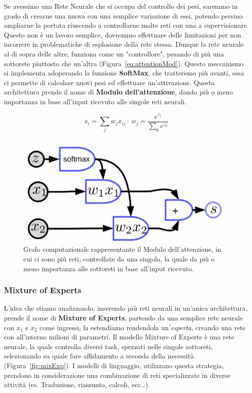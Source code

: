 Se avessimo una Rete Neurale che si occupa del controllo dei pesi, saremmo in grado di crearne una nuova con una semplice variazione di essi, potendo persino ampliarne la portata riuscendo a controllarne molte reti con una a supervisionare. Questo non è un lavoro semplice, dovremmo effettuare delle limitazioni per non incorrere in problematiche di esplosione della rete stessa. Dunque la rete neurale al di sopra delle altre, funziona come un "controllore", pesando di più una sottorete piuttosto che un'altra (Figura~\ref{eq:attentionMod}). Questo meccanismo si implementa adoperando la funzione \textbf{SoftMax}, che tratteremo più avanti, essa ci permette di calcolare nuovi pesi ed effettuare un'attivazione. Questa architettura prende il nome di \textbf{Modulo dell'attenzione}, dando più o meno importanza in base all'input ricevuto alle singole reti neurali.

\begin{equation}
    s_i = \sum_jw_jx_{ij} \,:\,w_j=\frac{e^{z_{j}}}{\sum_ke^{z_k}}
    \label{eq:attentionMod}
\end{equation}

\begin{figure}[htbp]
    \centering
    \includegraphics[width=0.4\linewidth]{figure/AttentionModule.png}
    \caption{Grafo computazionale rappresentante il Modulo dell'attenzione, in cui ci sono più reti, controllate da una singola, la quale da più o meno importanza alle sottoreti in base all'input ricevuto.}
    \label{fig:AttentionMod}
\end{figure}

\subsubsection{Mixture of Experts}
L'idea che stiamo analizzando, inserendo più reti neurali in un'unica architettura, prende il nome di \textbf{Mixture of Experts}, partendo da una semplice rete neurale con $x_1$ e $x_2$ come ingressi, la estendiamo rendendola un'\textit{esperta}, creando una rete con all'interno milioni di parametri. Il modello Mixture of Experts è una rete neurale, la quale controlla diversi task, spezzati nelle singole sottoreti, selezionando su quale fare affidamento a seconda della necessità (Figura~\ref{fig:mixExp}). I modelli di linguaggio, utilizzano questa strategia, prendono in considerazione una combinazione di reti specializzate in diverse attività (es. Traduzione, riassunto, calcoli, ecc\dots). 

